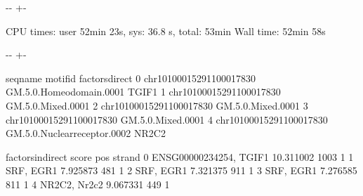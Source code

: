 \documentclass[letterpaper,10pt,english]{sphinxmanual}
\newlength\nbsphinxcodecellspacing
\begin{document}
%
{
\kern-\sphinxverbatimsmallskipamount\kern-\baselineskip
\kern+\FrameHeightAdjust\kern-\fboxrule
\vspace{\nbsphinxcodecellspacing}
%
\begin{sphinxVerbatim}[commandchars=\\\{\}]

CPU times: user 52min 23s, sys: 36.8 s, total: 53min
Wall time: 52min 58s
\end{sphinxVerbatim}
}
\relax

{
%
\begin{sphinxVerbatim}[commandchars=\\\{\}]
\llap{\color{nbsphinxin}[16]:\,\hspace{\fboxrule}\hspace{\fboxsep}}
\end{sphinxVerbatim}
}

{

\kern-\sphinxverbatimsmallskipamount\kern-\baselineskip
\kern+\FrameHeightAdjust\kern-\fboxrule
\vspace{\nbsphinxcodecellspacing}

%
\begin{sphinxVerbatim}[commandchars=\\\{\}]
\llap{\color{nbsphinxout}[16]:\,\hspace{\fboxrule}\hspace{\fboxsep}}                     seqname                      motif\PYGZus{}id factors\PYGZus{}direct  \PYGZbs{}
0  chr10\PYGZus{}100015291\PYGZus{}100017830       GM.5.0.Homeodomain.0001          TGIF1
1  chr10\PYGZus{}100015291\PYGZus{}100017830             GM.5.0.Mixed.0001
2  chr10\PYGZus{}100015291\PYGZus{}100017830             GM.5.0.Mixed.0001
3  chr10\PYGZus{}100015291\PYGZus{}100017830             GM.5.0.Mixed.0001
4  chr10\PYGZus{}100015291\PYGZus{}100017830  GM.5.0.Nuclear\PYGZus{}receptor.0002          NR2C2

         factors\PYGZus{}indirect      score   pos  strand
0  ENSG00000234254, TGIF1  10.311002  1003       1
1               SRF, EGR1   7.925873   481       1
2               SRF, EGR1   7.321375   911      \PYGZhy{}1
3               SRF, EGR1   7.276585   811      \PYGZhy{}1
4            NR2C2, Nr2c2   9.067331   449      \PYGZhy{}1
\end{sphinxVerbatim}
}
\end{document}

